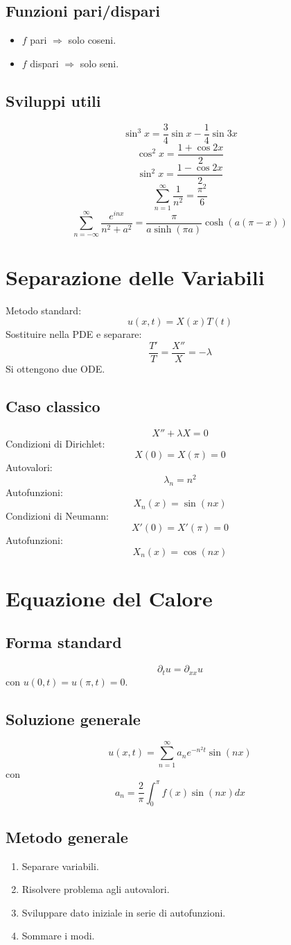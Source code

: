 \documentclass[a4paper,10pt]{article}
\begin{document}
\subsection{Funzioni pari/dispari}
\begin{itemize}
\item $f$ pari $\Rightarrow$ solo coseni.
\item $f$ dispari $\Rightarrow$ solo seni.
\end{itemize}
\subsection{Sviluppi utili}
\[\sin^3x=\frac{3}{4}\sin x-\frac14\sin 3x\]
\[\cos^2x=\frac{1+\cos 2x}{2}\]
\[\sin^2x=\frac{1-\cos 2x}{2}\]
\[\sum_{n=1}^{\infty}\frac1{n^2}=\frac{\pi^2}{6}\]
\[\sum_{n=-\infty}^{\infty}\frac{e^{inx}}{n^2+a^2}
=\frac{\pi}{a\sinh(\pi a)}\cosh(a(\pi-x))\]
\section{Separazione delle Variabili}
Metodo standard:
\[u(x,t)=X(x)T(t)\]
Sostituire nella PDE e separare:
\[\frac{T'}{T}=\frac{X''}{X}=-\lambda\]
Si ottengono due ODE.
\subsection{Caso classico}
\[X''+\lambda X=0\]
Condizioni di Dirichlet:
\[X(0)=X(\pi)=0\]
Autovalori:
\[\lambda_n=n^2\]
Autofunzioni:
\[X_n(x)=\sin(nx)\]
Condizioni di Neumann:
\[X'(0)=X'(\pi)=0\]
Autofunzioni:
\[X_n(x)=\cos(nx)\]
\section{Equazione del Calore}
\subsection{Forma standard}
\[\partial_t u=\partial_{xx}u\]
con $u(0,t)=u(\pi,t)=0$.
\subsection{Soluzione generale}
\[u(x,t)=\sum_{n=1}^{\infty} a_n e^{-n^2 t}\sin(nx)\]
con
\[a_n=\frac{2}{\pi}\int_0^{\pi}f(x)\sin(nx)dx\]
\subsection{Metodo generale}
\begin{enumerate}
\item Separare variabili.
\item Risolvere problema agli autovalori.
\item Sviluppare dato iniziale in serie di autofunzioni.
\item Sommare i modi.
\end{enumerate}
\end{document}
